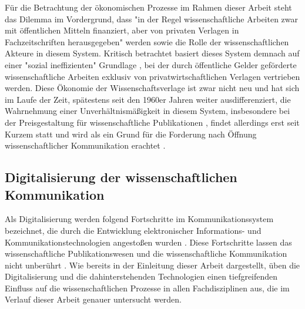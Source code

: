 Für die Betrachtung der ökonomischen Prozesse im Rahmen dieser Arbeit steht das Dilemma im Vordergrund, dass "in der Regel wissenschaftliche Arbeiten zwar mit öffentlichen Mitteln finanziert, aber von privaten Verlagen in Fachzeitschriften herausgegeben" \cite[:9]{Cloes_2009} werden sowie die Rolle der wissenschaftlichen Akteure in diesem System. Kritisch betrachtet basiert dieses System demnach auf einer "sozial ineffizienten" Grundlage \cite[:47]{Mueller-Langer_2010}, bei der durch öffentliche Gelder geförderte wissenschaftliche Arbeiten exklusiv von privatwirtschaftlichen Verlagen vertrieben werden. Diese Ökonomie der Wissenschaftsverlage ist zwar nicht neu und hat sich im Laufe der Zeit, spätestens seit den 1960er Jahren weiter ausdifferenziert, die Wahrnehmung einer Unverhältnismäßigkeit in diesem System, insbesondere bei der Preisgestaltung für wissenschaftliche Publikationen \cite{King_2008}, findet allerdings erst seit Kurzem statt \cite{CREATe_2014} und wird als ein Grund für die Forderung nach Öffnung wissenschaftlicher Kommunikation erachtet \cite{Yiotis_2005} \cite{Herb_2010}.

\subsection{Digitalisierung der wissenschaftlichen Kommunikation}

Als Digitalisierung werden folgend Fortschritte im Kommunikationssystem bezeichnet, die durch die Entwicklung elektronischer Informations- und Kommunikationstechnologien angestoßen wurden \cite{BBAW_2015}. Diese Fortschritte lassen das wissenschaftliche Publikationswesen und die wissenschaftliche Kommunikation nicht unberührt \cite{Naeder_2010}. Wie bereits in der Einleitung dieser Arbeit dargestellt, üben die Digitalisierung und die dahinterstehenden Technologien einen tiefgreifenden Einfluss auf die wissenschaftlichen Prozesse in allen Fachdisziplinen aus, die im Verlauf dieser Arbeit genauer untersucht werden.

